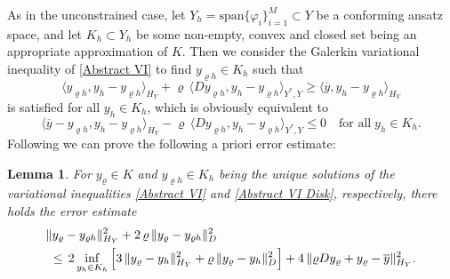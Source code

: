 \documentclass{article}
\newtheorem{lemma}{Lemma}
\numberwithin{equation}{section}
\begin{document}
As in the unconstrained case, let
$Y_h = \mbox{span} \{ \varphi_i \}_{i=1}^M \subset Y$
be a conforming ansatz space, and let $K_h \subset Y_h$ 
be some non-empty, convex and closed set being an appropriate
approximation of $K$. Then we consider the
Galerkin variational inequality of \eqref{Abstract VI} to find
$y_{\varrho h} \in K_h$ such that
\begin{equation}\label{Abstract VI Disk}
  \langle y_{\varrho h} , y_h - y_{\varrho h} \rangle_{H_Y} +
  \varrho \, \langle D y_{\varrho h} , y_h - y_{\varrho h} \rangle_{Y^*,Y} \geq
  \langle \overline{y} , y_h - y_{\varrho h} \rangle_{H_Y}
\end{equation}
is satisfied for all $y_h \in K_h$, which is obviously equivalent to
\[
  \langle \overline{y} - y_{\varrho h}, y_h - y_{\varrho h} \rangle_{H_Y}
  - 
  \varrho \, \langle D y_{\varrho h} , y_h - y_{\varrho h} \rangle_{Y^*,Y}
  \leq 0 \quad \mbox{for all} \; y_h \in K_h .
\]
Following \cite{Falk:1974}
we can prove the following a priori error estimate:

\begin{lemma}
  For $y_\varrho \in K$ and $y_{\varrho h} \in K_h$ being the unique
  solutions of the variational inequalities
  \eqref{Abstract VI} and \eqref{Abstract VI Disk}, respectively,
  there holds the error estimate
  \begin{eqnarray*}
    \| y_\varrho - y_{\varrho h} \|^2_{H_Y} +
    2 \, \varrho \, \| y_\varrho - y_{\varrho h} \|^2_D
    && \\
    && \hspace*{-5cm}
       \leq \, 2 \inf\limits_{y_h \in K_h} \Big[ 
       3 \, \| y_\varrho - y_h \|_{H_Y}^2 +
       \varrho \, \| y_\varrho - y_h \|^2_D \Big] +
       4 \, \| \varrho D y_\varrho + y_\varrho - \overline{y} \|_{H_Y}^2 .
  \end{eqnarray*}
\end{lemma}
\end{document}
